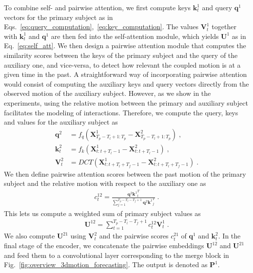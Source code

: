 To combine self- and pairwise attention, we first compute keys $\textbf{k}^{1}_{t}$ and query $\textbf{q}^{1}$ vectors for the primary subject as in Eqs.~\ref{eq:query_computation},~\ref{eq:key_computation}. The values $\textbf{V}^{1}_{t}$ together with $\textbf{k}^{1}_{t}$ and $\textbf{q}^{1}$ are then fed into the self-attention module, which yields ${\textbf{U}}^{1}$ as in Eq.~\ref{eq:self_att}. We then design a pairwise attention module that computes the similarity scores between the keys of the primary subject and the query of the auxiliary one, and vice-versa, to detect how relevant the coupled motion is at a given time in the past. A straightforward way of incorporating pairwise attention would consist of computing the auxiliary keys and query vectors directly from the observed motion of the auxiliary subject. However, as we show in the experiments, using the relative motion between the primary and auxiliary subject facilitates the modeling of interactions. Therefore, we compute the query, keys and values for the auxiliary subject as
\begin{align}
	\textbf{q}^{2} &= f_q(\textbf{X}^{1}_{{T}_p-{T}_l+1:{T}_p} - \textbf{X}^{2}_{{T}_p-{T}_l+1:{T}_p})  \; , \label{eq:pwise_query_computation}\\
	\textbf{k}^{2}_{t} &= f_k(\textbf{X}^{1}_{t:t+{T}_l-1} - \textbf{X}^{2}_{t:t+{T}_l-1}) \; , \label{eq:pwise_key_computation} \\
	\textbf{V}^{2}_{t}&= DCT(\textbf{X}^{1}_{t:t+{T}_l+{T}_f-1} - \textbf{X}^{2}_{t:t+{T}_l+{T}_f-1}) \; .\label{eq:pwise_value_computation}
\end{align}
We then define pairwise attention scores between the past motion of the primary subject and the relative motion with respect to the auxiliary one as
\begin{align}
	c^{12}_{t} = \frac{\textbf{q}^{2}{\textbf{k}^{1}}_{t}^T}{\sum_{j=1}^{{T}_p-{T}_l-{T}_f+1}\textbf{q}^{2}{\textbf{k}^{1}}_{j}^T} \; . \label{eq:pwise_scores}
\end{align}
This lets us compute a weighted sum of primary subject values as
\begin{align}
	\textbf{U}^{12} = \sum_{t=1}^{{T}_p-{T}_l-{T}_f+1}c^{12}_{t} \textbf{V}^{1}_{t} \;.
\end{align}
We also compute $\textbf{U}^{21}$ using $\textbf{V}^{2}_{t}$ and the pairwise scores  $c^{21}_{t}$ of $\textbf{q}^{1}$ and $\textbf{k}^{2}_{t}$. In the final stage of the encoder, we concatenate the pairwise embeddings ${\textbf{U}}^{12}$ and ${\textbf{U}}^{21}$ and feed them to a convolutional layer corresponding to the merge block in Fig.~\ref{fig:overview_3dmotion_forecasting}. The output is denoted as ${\textbf{P}}^{1}$. 

